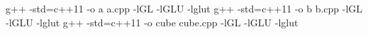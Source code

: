 g++ -\/std=c++11 -\/o a a.\+cpp -\/l\+GL -\/l\+G\+LU -\/lglut g++ -\/std=c++11 -\/o b b.\+cpp -\/l\+GL -\/l\+G\+LU -\/lglut g++ -\/std=c++11 -\/o cube cube.\+cpp -\/l\+GL -\/l\+G\+LU -\/lglut 